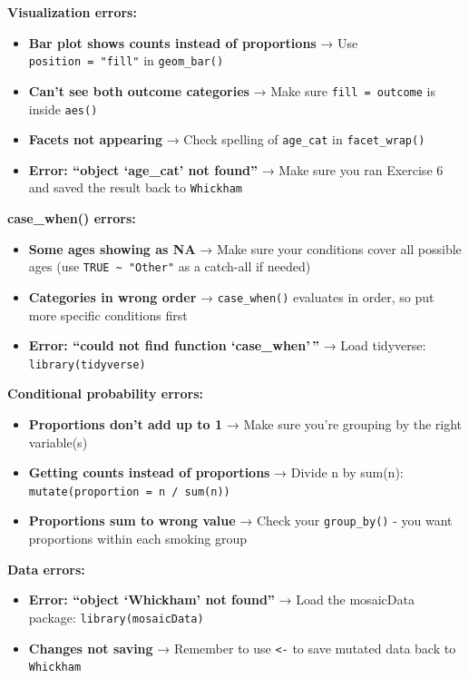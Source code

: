 \documentclass[]{tufte-handout}
\providecommand{\tightlist}{%
  \setlength{\itemsep}{0pt}\setlength{\parskip}{0pt}}
\begin{document}
\textbf{Visualization errors:}

\begin{itemize}
\tightlist
\item
  \textbf{Bar plot shows counts instead of proportions} → Use
  \texttt{position\ =\ "fill"} in \texttt{geom\_bar()}
\item
  \textbf{Can't see both outcome categories} → Make sure
  \texttt{fill\ =\ outcome} is inside \texttt{aes()}
\item
  \textbf{Facets not appearing} → Check spelling of \texttt{age\_cat} in
  \texttt{facet\_wrap()}
\item
  \textbf{Error: ``object `age\_cat' not found''} → Make sure you ran
  Exercise 6 and saved the result back to \texttt{Whickham}
\end{itemize}

\textbf{case\_when() errors:}

\begin{itemize}
\tightlist
\item
  \textbf{Some ages showing as NA} → Make sure your conditions cover all
  possible ages (use \texttt{TRUE\ \textasciitilde{}\ "Other"} as a
  catch-all if needed)
\item
  \textbf{Categories in wrong order} → \texttt{case\_when()} evaluates
  in order, so put more specific conditions first
\item
  \textbf{Error: ``could not find function `case\_when'\,''} → Load
  tidyverse: \texttt{library(tidyverse)}
\end{itemize}

\textbf{Conditional probability errors:}

\begin{itemize}
\tightlist
\item
  \textbf{Proportions don't add up to 1} → Make sure you're grouping by
  the right variable(s)
\item
  \textbf{Getting counts instead of proportions} → Divide n by sum(n):
  \texttt{mutate(proportion\ =\ n\ /\ sum(n))}
\item
  \textbf{Proportions sum to wrong value} → Check your
  \texttt{group\_by()} - you want proportions within each smoking group
\end{itemize}

\textbf{Data errors:}

\begin{itemize}
\tightlist
\item
  \textbf{Error: ``object `Whickham' not found''} → Load the mosaicData
  package: \texttt{library(mosaicData)}
\item
  \textbf{Changes not saving} → Remember to use \texttt{\textless{}-} to
  save mutated data back to \texttt{Whickham}
\end{itemize}
\end{document}
